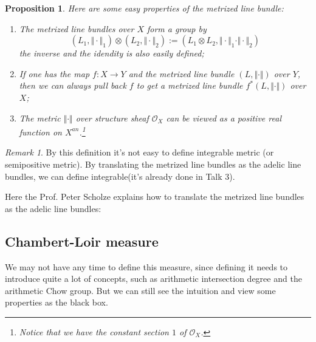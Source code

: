 \documentclass[reqno,11pt]{amsart}
\numberwithin{equation}{section}
\theoremstyle{plain}
\newtheorem{proposition}[theorem]{Proposition}
\theoremstyle{plain}
\numberwithin{equation}{section}
\theoremstyle{remark}
\newtheorem{remark}[theorem]{Remark}
\newcommand{\norm}[1]{\Vert{#1}\Vert}
\begin{document}
\begin{proposition}
Here are some easy properties of the metrized line bundle:
\begin{enumerate}[(1)]
\item The metrized line bundles over $X$ form a group by
$$(L_1,\norm{\cdot}_1) \otimes (L_2,\norm{\cdot}_2):=(L_1 \otimes L_2, \norm{\cdot}_1\cdot \norm{\cdot}_2)$$
the inverse and the idendity is also easily defined;
\item If one has the map $f:X \longrightarrow Y$ and the metrized line bundle $(L,\norm{\cdot})$ over $Y$, then we can always pull back $f$ to get a metrized line bundle $f^*(L,\norm{\cdot})$ over $X$;
\item The metric $\norm{\cdot}$ over structure sheaf $\mathcal{O}_X$ can be viewed as a positive real function on $X^{an}$.\footnote{Notice that we have the constant section $1$ of $\mathcal{O}_X$.}
\end{enumerate} 
\end{proposition}
\begin{remark}
By this definition it's not easy to define integrable metric (or semipositive metric). By translating the metrized line bundles as the adelic line bundles, we can define integrable(it's already done in Talk 3).
\end{remark}
Here the Prof. Peter Scholze explains how to translate the metrized line bundles as the adelic line bundles:


\subsection{Chambert-Loir measure}
We may not have any time to define this measure, since defining it needs to introduce quite a lot of concepts, such as arithmetic intersection degree and the arithmetic Chow group. But we can still see the intuition and view some properties as the black box.
\end{document}

